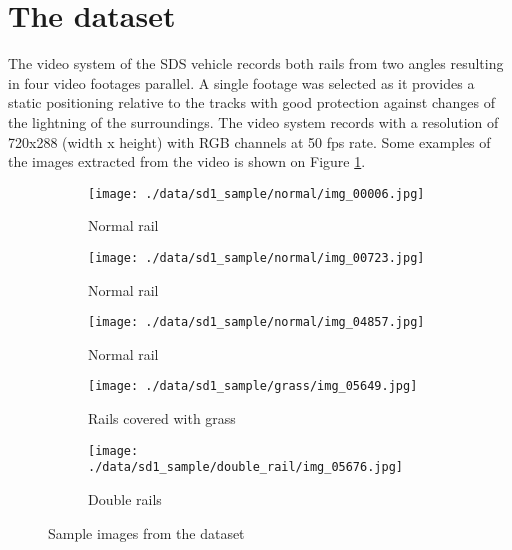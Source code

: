 \section{The dataset}
The video system of the SDS vehicle records both rails from two angles resulting in four video footages
parallel.
A single footage was selected as it provides a static positioning relative to the tracks with good
protection against changes of the lightning of the surroundings.
The video system records with a resolution of 720x288 (width x height) with RGB channels
at 50 fps rate.
Some examples of the images extracted from the video is shown on Figure \ref{fig:example_images}.

\begin{figure}[!ht]
    \centering
    \begin{subfigure}{0.3\textwidth}
        \centering
        \texttt{[image: ./data/sd1\_sample/normal/img\_00006.jpg]}
        \caption*{Normal rail}
    \end{subfigure}
    \begin{subfigure}{0.3\textwidth}
        \centering
        \texttt{[image: ./data/sd1\_sample/normal/img\_00723.jpg]}
        \caption*{Normal rail}
    \end{subfigure}
    \begin{subfigure}{0.3\textwidth}
        \centering
        \texttt{[image: ./data/sd1\_sample/normal/img\_04857.jpg]}
        \caption*{Normal rail}
    \end{subfigure}
    \begin{subfigure}{0.3\textwidth}
        \centering
        \texttt{[image: ./data/sd1\_sample/grass/img\_05649.jpg]}
        \caption*{Rails covered with grass}
    \end{subfigure}
    \begin{subfigure}{0.3\textwidth}
        \centering
        \texttt{[image: ./data/sd1\_sample/double\_rail/img\_05676.jpg]}
        \caption*{Double rails}
    \end{subfigure}
    \caption{Sample images from the dataset}
    \label{fig:example_images}
\end{figure}